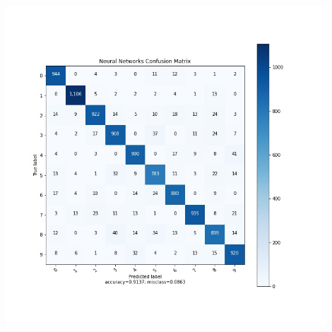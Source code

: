 \documentclass[twoside,10pt]{article}
\begin{document}
\begin{enumerate}
\begin{enumerate}
\begin{tcolorbox}
\begin{itemize}
\begin{center}
\end{center}
\includegraphics[width=0.9\textwidth]{images/cm_Neu.jpg}

\end{itemize}


\end{tcolorbox}
\end{enumerate}
\end{enumerate}
\end{document}

